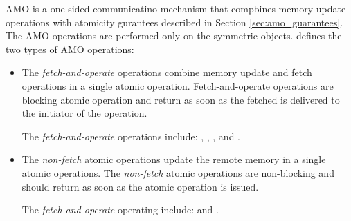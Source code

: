 \label{sec:amo}
\ac{AMO} is a one-sided communicatino mechanism that compbines memory update operations with atomicity gurantees described in Section \ref{sec:amo_guarantees}. 
The \ac{AMO} operations are performed only on the symmetric objects. 
\openshmem{} defines the two types of \ac{AMO} operations:
\begin{itemize}
\item
The \textit{fetch-and-operate} operations combine memory update and fetch 
operations in a single atomic operation.
Fetch-and-operate operations are blocking atomic operation and return as
soon as the fetched is delivered to the initiator of the operation.

The \textit{fetch-and-operate} operations include: , , , and .

\item
The \textit{non-fetch} atomic operations update the remote memory 
in a single atomic operations.
The \textit{non-fetch} atomic operations are non-blocking and should return as
soon as the atomic operation is issued.

The \textit{fetch-and-operate} operating include:  and .
\end{itemize}
